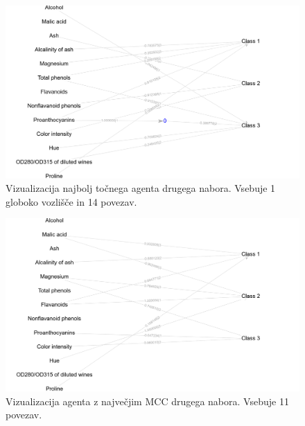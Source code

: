 \begin{figure}[H]
    \begin{center}
        \includegraphics[width=13cm]{wine/2/acc_g}
    \end{center}
    \caption{Vizualizacija najbolj točnega agenta drugega nabora. Vsebuje 1 globoko vozlišče in 14 povezav.}
    \label{fig:wine_acc_2_g}
\end{figure}

\begin{figure}[H]
    \begin{center}
        \includegraphics[width=13cm]{wine/2/mcc_g}
    \end{center}
    \caption{Vizualizacija agenta z največjim MCC drugega nabora. Vsebuje 11 povezav.}
    \label{fig:wine_mcc_2_g}
\end{figure}

